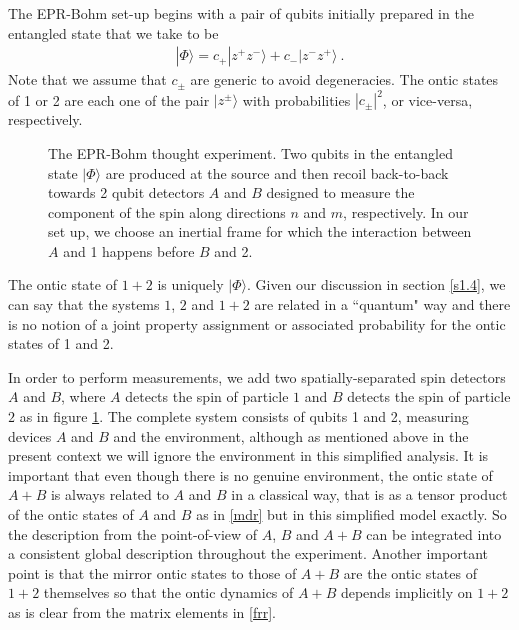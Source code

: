 \documentclass[%
preprint,
nofootinbib,
 amsmath,amssymb,
aps,
]{revtex4-1}
\def\ket#1{| #1\rangle}
\newcommand{\EQ}[1]{\begin{equation}\begin{split} #1
\end{split}\end{equation}}
\begin{document}
The EPR-Bohm set-up begins with a pair of qubits initially prepared in the entangled state that we take to be
\EQ{
\ket{\Phi}=c_+\ket{z^+z^-}+c_-\ket{z^-z^+}\ .
}
Note that we assume that $c_\pm$ are generic to avoid degeneracies.
The ontic states of 1 or 2 are each one of the pair $\ket{z^\pm}$ with probabilities $|c_\pm|^2$, or vice-versa, respectively. 
\begin{figure}[ht]
\begin{center}
\end{center}
\caption{\small The EPR-Bohm thought experiment. Two qubits in the entangled state $\ket{\Phi}$ are produced at the source and then recoil back-to-back towards 2 qubit detectors $A$ and $B$ designed to measure the component of the spin along directions $n$ and $m$, respectively. In our set up, we choose an inertial frame for which the interaction between $A$ and 1 happens before $B$ and 2.}
\label{f18}
\end{figure}

The ontic state of $1+2$ is uniquely $\ket{\Phi}$. Given our discussion in section \ref{s1.4}, we can say that the systems $1$, $2$ and $1+2$ are related in a ``quantum" way and there is no notion of a joint property assignment or associated probability for the ontic states of 1 and 2. 
 
In order to perform measurements, we
add two spatially-separated spin detectors $A$ and
$B$, where $A$ detects the spin of particle $1$ and $B$ detects
the spin of particle $2$ as in figure \ref{f18}.
The complete system consists of qubits 1 and 2, measuring devices $A$ and $B$ and the environment, although as mentioned above in the present context we will ignore the environment in this simplified analysis. It is important that even though there is no genuine environment, the ontic state of $A+B$ is always related to $A$ and $B$ in a classical way, that is as a tensor product of the ontic states of $A$ and $B$ as in \eqref{mdr} but in this simplified model exactly. So the description from the point-of-view of $A$, $B$ and $A+B$ can be integrated into a consistent global description throughout the experiment. Another important point is that the mirror ontic states to those of $A+B$ are the ontic states of $1+2$ themselves so that the ontic dynamics of $A+B$ depends implicitly on $1+2$ as is clear from the matrix elements in \eqref{frr}.
\end{document}
